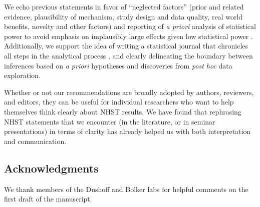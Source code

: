 We echo previous statements in favor of ``neglected factors'' (prior and related evidence, plausibility of mechanism, study design and data quality, real world benefits, novelty and other factors) \citep{McShaneetal.2017} and reporting of \emph{a priori} analysis of statistical power to avoid emphasis on implausibly large effects given low statistical power \citep[the ``winner's curse''][]{GelmanandCarlin2014, SzucsandIoannidis2017, Bernardietal.2017}.  
Additionally, we support the idea of writing a statistical journal that chronicles all steps in the analytical process \citep{Kassetal.2016}, and clearly delineating the boundary between inferences based on \emph{a priori} hypotheses and discoveries from \emph{post hoc} data exploration.

Whether or not our recommendations are broadly adopted by authors, reviewers, and editors, they can be useful for individual researchers who want to help themselves think clearly about NHST results. We have found that rephrasing NHST statements that we encounter (in the literature, or in seminar presentations) in terms of clarity has already helped us with both interpretation and communication.

\subsection*{Acknowledgments}

We thank members of the Dushoff and Bolker labs for helpful comments on the first draft of the manuscript.
